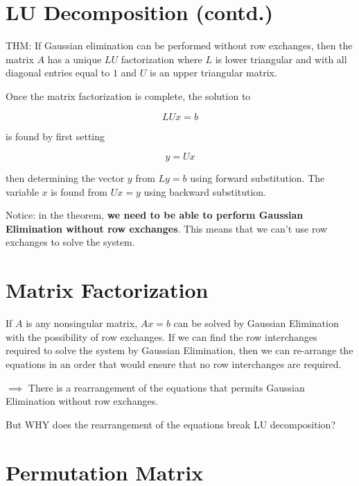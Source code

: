\renewcommand{\arraystretch}{1.25} %
\setlength{\arraycolsep}{12pt}

\section{LU Decomposition (contd.)}

THM: If Gaussian elimination can be performed without row exchanges, then the
matrix $A$ has a unique $LU$ factorization where $L$ is lower triangular and
with all diagonal entries equal to $1$ and $U$ is an upper triangular matrix.

Once the matrix factorization is complete, the solution to

\begin{equation*}
  LUx = b
\end{equation*}

is found by first setting 

\begin{equation*}
  y=Ux
\end{equation*}

then determining the vector $y$ from $Ly=b$ using forward substitution. The
variable $x$ is found from $Ux=y$ using backward substitution.

Notice: in the theorem, \textbf{we need to be able to perform Gaussian
Elimination without row exchanges}. This means that we can't use row
exchanges to solve the system.

\section{Matrix Factorization}

If $A$ is any nonsingular matrix, $Ax=b$ can be solved by Gaussian Elimination
with the possibility of row exchanges. If we can find the row interchanges
required to solve the system by Gaussian Elimination, then we can re-arrange
the equations in an order that would ensure that no row interchanges are
required.

$\implies$ There is a rearrangement of the equations that permits Gaussian
Elimination without row exchanges.

But WHY does the rearrangement of the equations break LU decomposition?

\section{Permutation Matrix}

